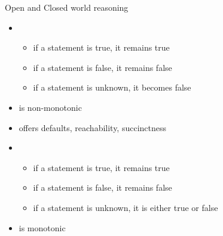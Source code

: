 \begin{frame}{Open and Closed world reasoning}
  \begin{itemize}
  \item<1-> 
    \begin{itemize}
    \item if a statement is true, it remains true
    \item if a statement is false, it remains false
    \item if a statement is unknown, it becomes false
    \end{itemize}
  \item<3-> is non-monotonic
  \item<4-> offers defaults, reachability, succinctness
    \medskip
  \item<2-> 
    \begin{itemize}
    \item if a statement is true, it remains true
    \item if a statement is false, it remains false
    \item if a statement is unknown, it is either true or false
    \end{itemize}
  \item<3-> is monotonic
\end{itemize}
\end{frame}
